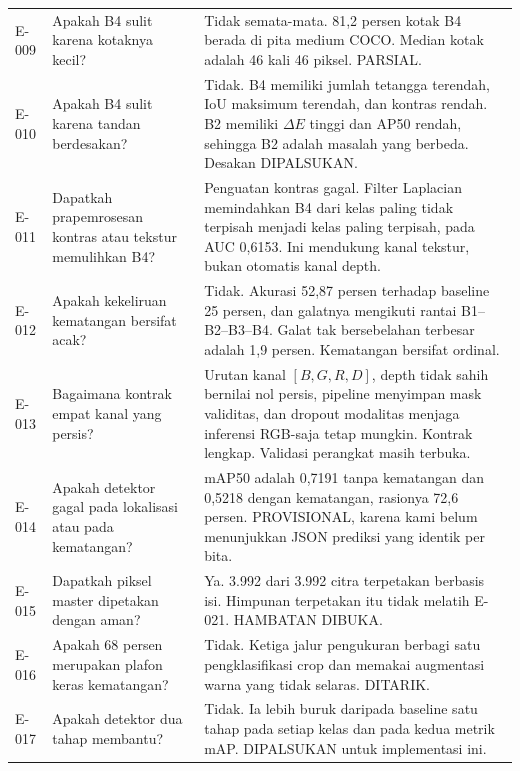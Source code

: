 \documentclass[preprint,12pt]{elsarticle}
\newcommand{\E}[1]{E-#1}
\newcommand{\mAP}{mAP}
\begin{document}
\begin{longtable}{L{0.07\textwidth}L{0.28\textwidth}L{0.55\textwidth}}
\E{009} & Apakah B4 sulit karena kotaknya kecil? & Tidak semata-mata. 81,2
persen kotak B4 berada di pita medium COCO. Median kotak adalah 46 kali 46
piksel. PARSIAL.\\

\E{010} & Apakah B4 sulit karena tandan berdesakan? & Tidak. B4 memiliki jumlah
tetangga terendah, IoU maksimum terendah, dan kontras rendah. B2 memiliki
$\Delta E$ tinggi dan AP50 rendah, sehingga B2 adalah masalah yang berbeda.
Desakan DIPALSUKAN.\\

\E{011} & Dapatkah prapemrosesan kontras atau tekstur memulihkan B4? & Penguatan
kontras gagal. Filter Laplacian memindahkan B4 dari kelas paling tidak terpisah
menjadi kelas paling terpisah, pada AUC 0,6153. Ini mendukung kanal tekstur,
bukan otomatis kanal depth.\\

\E{012} & Apakah kekeliruan kematangan bersifat acak? & Tidak. Akurasi 52,87
persen terhadap baseline 25 persen, dan galatnya mengikuti rantai
B1--B2--B3--B4. Galat tak bersebelahan terbesar adalah 1,9 persen. Kematangan
bersifat ordinal.\\

\E{013} & Bagaimana kontrak empat kanal yang persis? & Urutan kanal
\([B,G,R,D]\), depth tidak sahih bernilai nol persis, pipeline menyimpan mask
validitas, dan dropout modalitas menjaga inferensi RGB-saja tetap mungkin.
Kontrak lengkap. Validasi perangkat masih terbuka.\\

\E{014} & Apakah detektor gagal pada lokalisasi atau pada kematangan? & \mAP50
adalah 0,7191 tanpa kematangan dan 0,5218 dengan kematangan, rasionya 72,6
persen. PROVISIONAL, karena kami belum menunjukkan JSON prediksi yang identik
per bita.\\

\E{015} & Dapatkah piksel master dipetakan dengan aman? & Ya. 3.992 dari 3.992
citra terpetakan berbasis isi. Himpunan terpetakan itu tidak melatih \E{021}.
HAMBATAN DIBUKA.\\

\E{016} & Apakah 68 persen merupakan plafon keras kematangan? & Tidak. Ketiga
jalur pengukuran berbagi satu pengklasifikasi crop dan memakai augmentasi warna
yang tidak selaras. DITARIK.\\

\E{017} & Apakah detektor dua tahap membantu? & Tidak. Ia lebih buruk daripada
baseline satu tahap pada setiap kelas dan pada kedua metrik \mAP. DIPALSUKAN
untuk implementasi ini.\\


\end{longtable}
\end{document}
